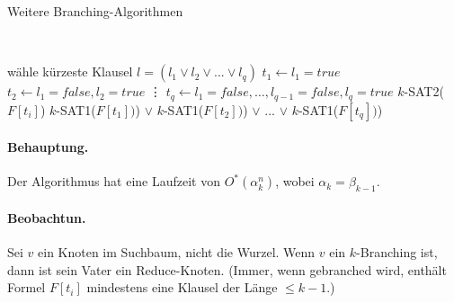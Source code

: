 \begin{section}{Weitere Branching-Algorithmen}
\begin{algorithm}[H]
     \\


    wähle {\color{red}kürzeste} Klausel \(l = (l_1 \vee l_2 \vee ... \vee l_q)\)\;
    $t_1 \leftarrow l_1 = true$\; 
    $t_2 \leftarrow l_1 = false, l_2 = true$\;
    \vdots
    $t_q \leftarrow l_1 = false, \dots, l_{q-1} = false, l_q = true$\; 
    {\color{red} 
       {
	\Return $k$-SAT2($F[t_i]$)
      }
    }
    \Return \(k\)-SAT1(\(F[t_1])\)) \(\vee\) \(k\)-SAT1(\(F[t_2])\)) \(\vee\) ... \(\vee\) \(k\)-SAT1(\(F[t_q])\))\;
  \end{algorithm}
  \paragraph{Behauptung.} Der Algorithmus hat eine Laufzeit von $O^*(\alpha_k^n)$, wobei $\alpha_k = \beta_{k-1}$.
  \paragraph{Beobachtun.} Sei $v$ ein Knoten im Suchbaum, nicht die Wurzel. Wenn $v$ ein $k$-Branching ist, dann ist sein Vater ein Reduce-Knoten. (Immer, wenn gebranched wird, enthält Formel $F[t_i]$ mindestens eine Klausel der Länge $\leq k-1$.)
\end{section}
  
  